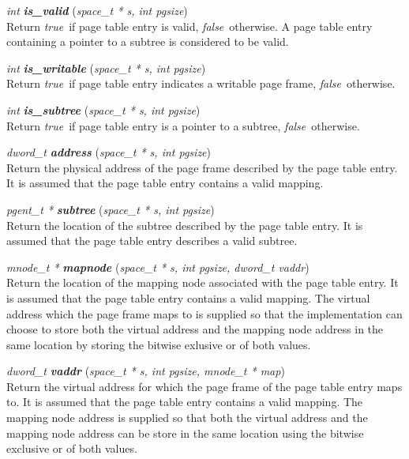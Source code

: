 \documentclass[a4paper,twoside]{book}
\newcommand{\fdecl}[3]{\emph{#1} {\bf\emph{#2}} (\emph{#3})}
\newcommand{\true}{\emph{true}}
\newcommand{\false}{\emph{false}}
\begin{document}
\begin{description}
  
\item{\fdecl{int}{is\_valid}{space\_t * s, int pgsize}\\} Return \true\ 
  if page table entry is valid, \false\ otherwise.  A page table entry
  containing a pointer to a subtree is considered to be valid.

\item{\fdecl{int}{is\_writable}{space\_t * s, int pgsize}\\}
  Return \true\ if page table entry indicates a writable page frame,
  \false\ otherwise.
  
\item{\fdecl{int}{is\_subtree}{space\_t * s, int pgsize}\\} Return
  \true\ if page table entry is a pointer to a subtree, \false\ 
  otherwise.
  
\item{\fdecl{dword\_t}{address}{space\_t * s, int pgsize}\\} Return the
  physical address of the page frame described by the page table
  entry.  It is assumed that the page table entry contains a valid
  mapping.
  
\item{\fdecl{pgent\_t *}{subtree}{space\_t * s, int pgsize}\\} Return
  the location of the subtree described by the page table entry.  It
  is assumed that the page table entry describes a valid subtree.
  
\item{\fdecl{mnode\_t *}{mapnode}{space\_t * s, int pgsize, dword\_t
      vaddr}\\} Return the location of the mapping node associated
  with the page table entry.  It is assumed that the page table entry
  contains a valid mapping.  The virtual address which the page frame
  maps to is supplied so that the implementation can choose to store
  both the virtual address and the mapping node address in the same
  location by storing the bitwise exlusive or of both values.
  
\item{\fdecl{dword\_t}{vaddr}{space\_t * s, int pgsize, mnode\_t *
      map}\\} Return the virtual address for which the page frame of
  the page table entry maps to.  It is assumed that the page table
  entry contains a valid mapping.  The mapping node address is
  supplied so that both the virtual address and the mapping node
  address can be store in the same location using the bitwise
  exclusive or of both values.
  

\end{description}
\end{document}
